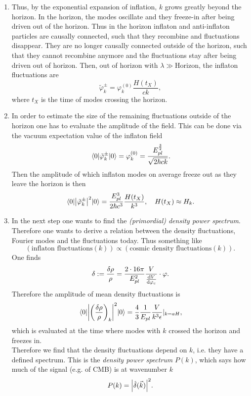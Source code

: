 \begin{enumerate}
\begin{mybox}{}
\begin{enumerate}
	\end{enumerate}
\end{mybox}
\item Thus, by the exponential expansion of inflation, $k$ grows greatly beyond the horizon. In the horizon, the modes oscillate and they freeze-in after being driven out of the horizon. Thus in the horizon inflaton and anti-inflaton particles are causally connected, such that they recombine and fluctuations disappear. They are no longer causally connected outside of the horizon, such that they cannot recombine anymore and the fluctuations stay after being driven out of horizon. Then, out of horizon with $\lambda \gg$Horizon, the inflaton fluctuations are 
\begin{equation*}
	\tilde{\varphi}^\pm_k=\varphi^{(0)}_k \frac{H(t_X)}{c k},
\end{equation*}
where $t_X$ is the time of modes crossing the horizon.
\item In order to estimate the size of the remaining fluctuations outside of the horizon one has to evaluate the amplitude of the field. This can be done via the vacuum expectation value of the inflaton field
\begin{equation}
\expval{\tilde{\varphi}^\pm_k}{0} = \varphi^{(0)}_k= \frac{E^{\frac{3}{2}}_{pl}}{\sqrt{2 \hbar c k} }.
\end{equation}
Then the amplitude of which inflaton modes on average freeze out as they leave the horizon is then
 \begin{equation}
 	\expval{\abs{\tilde{\varphi}^\pm_k}^2}{0} = \frac{E^3_{pl}}{2 \hbar c^3} \frac{H(t_X)}{k^3}, \quad H(t_X)\approx H_k.
 \end{equation}
 \item In the next step one wants to find the \emph{(primordial) density power spectrum}. Therefore one wants to derive a relation between the density fluctuations, Fourier modes and the fluctuations today. Thus something like 
 \begin{equation*}
 	(\text{inflaton fluctuations}(k))\propto (\text{cosmic density fluctuations}(k)).
 \end{equation*}
One finds
\begin{equation}
	\delta := \frac{\delta \rho}{\rho} = \frac{2 \cdot 16 \pi}{E^2_{pl}} \frac{V}{\frac{\mathrm{d} V}{\mathrm{d} \varphi_c}} \cdot \varphi. 
\end{equation}
Therefore the amplitude of mean density fluctuations is 
\begin{equation}
	\expval{\abs{\left(\frac{\delta \rho}{\rho}\right)_k}^2}{0} = \frac{4}{3} \frac{1}{E_{pl}} \frac{V}{k^3 \epsilon} |_{k=a H},
\end{equation}
which is evaluated at the time where modes with $k$ crossed the horizon and freezes in.\\
Therefore we find that the density fluctuations depend on $k$, i.e. they have a defined spectrum. This is the \emph{density power spectrum} $P(k)$, which says how much of the signal (e.g. of CMB) is at wavenumber $k$
\begin{equation}
	P(k)=\abs{\hat{\delta}(\vec{k}) }^2.
\end{equation}

\end{enumerate}
